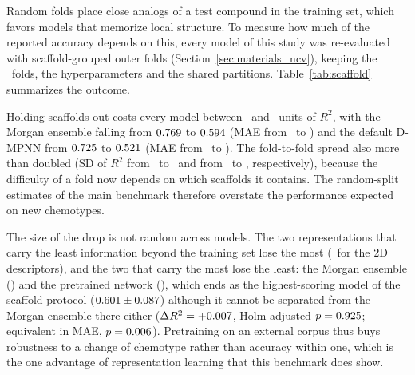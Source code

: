 Random folds place close analogs of a test compound in the training set, which favors models that memorize local
structure. To measure how much of the reported accuracy depends on this, every model of this study was re-evaluated
with scaffold-grouped outer folds (Section~\ref{sec:materials_ncv}), keeping the \TotalOuterFolds\ folds, the
hyperparameters and the shared partitions. Table~\ref{tab:scaffold} summarizes the outcome.

\begin{table}[htbp]
	\centering
	\caption{Cross-validated performance (mean $\pm$ SD over \TotalOuterFolds\ outer folds) under random and scaffold-grouped splits, ordered by the size of the drop in mean $R^2$. Both protocols share their outer partitions across models, so every column is a paired comparison.}
	\label{tab:scaffold}
\end{table}

Holding scaffolds out costs every model between \ScaffoldChemeleonDropRTwo\ and \ScaffoldRdkitTwoDDropRTwo\ units of
$R^2$, with the Morgan ensemble falling from $0.769$ to $0.594$ (MAE from
\RandomMorganMae\ to \ScaffoldMorganMae) and the default D-MPNN from $0.725$ to $0.521$
(MAE from \RandomGnnMae\ to \ScaffoldGnnMae). The fold-to-fold spread also more than doubled (SD of $R^2$ from
\RandomMorganRTwoStd\ to \ScaffoldMorganRTwoStd\ and from \RandomGnnRTwoStd\ to \ScaffoldGnnRTwoStd, respectively),
because the difficulty of a fold now depends on which scaffolds it contains. The random-split estimates of the main
benchmark therefore overstate the performance expected on new chemotypes.

The size of the drop is not random across models. The two representations that carry the least information beyond the
training set lose the most (\ScaffoldRdkitTwoDDropRTwo\ for the 2D descriptors), and the two that carry the most lose
the least: the Morgan ensemble (\ScaffoldMorganDropRTwo) and the pretrained network
(\ScaffoldChemeleonDropRTwo), which ends as the highest-scoring model of the scaffold protocol
($0.601 \pm 0.087$) although it cannot be separated from the Morgan ensemble
there either ($\Delta R^2 = +0.007$, Holm-adjusted $p = 0.925$;
equivalent in MAE, $p = 0.006$). Pretraining on an external corpus thus buys robustness
to a change of chemotype rather than accuracy within one, which is the one advantage of representation learning that
this benchmark does show.


